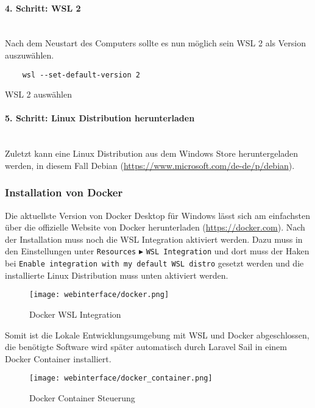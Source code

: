 \paragraph{4. Schritt: WSL 2}\mbox{}\\
Nach dem Neustart des Computers sollte es nun möglich sein WSL 2 als Version
auszuwählen.
\begin{listing}[H]
  \begin{verbatim}
    wsl --set-default-version 2
  \end{verbatim}
  \caption{WSL 2 auswählen}
\end{listing}

\paragraph{5. Schritt: Linux Distribution herunterladen}\mbox{}\\
Zuletzt kann eine Linux Distribution aus dem Windows Store heruntergeladen
werden, in diesem Fall Debian (\url{https://www.microsoft.com/de-de/p/debian}).


\subsubsection{Installation von Docker}
Die aktuellste Version von Docker Desktop für Windows lässt sich am einfachsten
über die offizielle Website von Docker herunterladen (\url{https://docker.com}).
Nach der Installation muss noch die WSL Integration aktiviert werden. Dazu muss
in den Einstellungen unter \verb|Resources| $\blacktriangleright$ \verb|WSL Integration| und
dort muss der Haken bei \verb|Enable integration with my default WSL distro| gesetzt
werden und die installierte Linux Distribution muss unten aktiviert werden.

\begin{figure}[H]
  \centering
  \texttt{[image: webinterface/docker.png]}
  \caption{Docker WSL Integration}
\end{figure}

Somit ist die Lokale Entwicklungsumgebung mit WSL und Docker abgeschlossen, die
benötigte Software wird später automatisch durch Laravel Sail in einem Docker
Container installiert.

\begin{figure}[H]
  \centering
  \texttt{[image: webinterface/docker\_container.png]}
  \caption{Docker Container Steuerung}
\end{figure}

